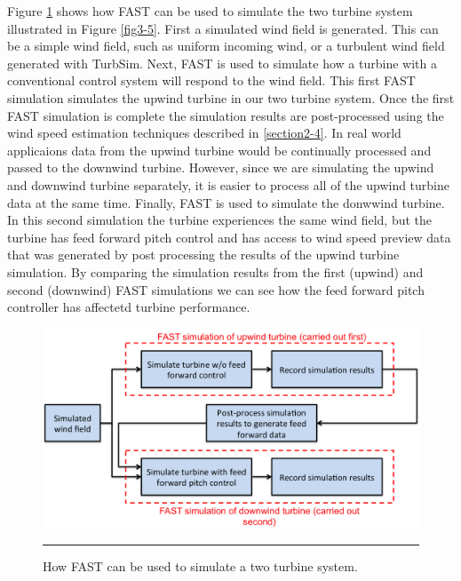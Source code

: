 Figure \ref{fig3-6} shows how FAST can be used to simulate the two turbine system illustrated in Figure \ref{fig3-5}. First a simulated wind field is generated. This can be a simple wind field, such as  uniform incoming wind, or a turbulent wind field generated with TurbSim. Next, FAST is used to simulate how a turbine with a conventional control system will respond to the  wind field. This first FAST simulation simulates the upwind turbine in our two turbine system. Once the first FAST simulation is complete the simulation results are post-processed using the wind speed estimation techniques described in \ref{section2-4}. In real world applicaions data from the upwind turbine would be continually processed and passed to the downwind turbine. However, since we are simulating the upwind and downwind turbine separately, it is easier to process all of the upwind turbine data at the same time. Finally, FAST is used to simulate the donwwind turbine. In this second simulation the turbine experiences the same wind field, but the turbine has feed forward pitch control and has access to wind speed preview data that was generated by post processing the results of the upwind turbine simulation. By comparing the simulation results from the first (upwind) and second (downwind) FAST simulations we can see how the feed forward pitch controller has affectetd turbine performance.

 \begin{figure}[htbp]
	\centering
		\includegraphics[width=\linewidth]{Figures/ch3Figures/fig3-6.png}
		\rule{35em}{0.5pt}
	\caption{How FAST can be used to simulate a two turbine system.}
	\label{fig3-6}
\end{figure}



